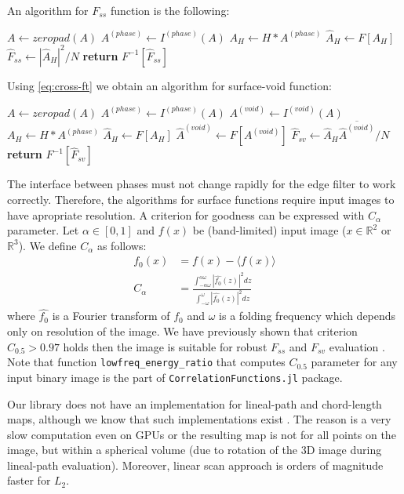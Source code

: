 \documentclass[1p]{elsarticle}
\newcommand{\code}[1]{\colorbox{light-gray}{\texttt{#1}}}
\begin{document}
An algorithm for $F_{ss}$ function is the following:
\begin{algorithmic}[1]
    \State $A \gets zeropad(A)$
  \EndIf
  \State $A^{(phase)} \gets I^{(phase)} (A)$
  \State $A_H \gets H * A^{(phase)}$
  \State $\hat{A}_H \gets F[A_H]$
  \State $\hat{F}_{ss} \gets |\hat{A}_H|^2 / N$
  \State \textbf{return} $F^{-1} [\hat{F}_{ss}]$
  \EndProcedure
\end{algorithmic}

Using \cref{eq:cross-ft} we obtain an algorithm for surface-void function:
\begin{algorithmic}[1]
    \State $A \gets zeropad(A)$
  \EndIf
  \State $A^{(phase)} \gets I^{(phase)} (A)$
  \State $A^{(void)} \gets I^{(void)} (A)$
  \State $A_H \gets H * A^{(phase)}$
  \State $\hat{A}_H \gets F[A_H]$
  \State $\hat{A}^{(void)} \gets F[A^{(void)}]$
  \State $\hat{F}_{sv} \gets \hat{A}_H \overline{\hat{A}^{(void)}} / N$
  \State \textbf{return} $F^{-1} [\hat{F}_{sv}]$
  \EndProcedure
\end{algorithmic}

The interface between phases must not change rapidly for the edge filter to
work correctly. Therefore, the algorithms for surface functions require input
images to have apropriate resolution. A criterion for goodness can be expressed with
$C_{\alpha}$ parameter. Let $\alpha \in [0, 1]$ and $f(x)$ be
(band-limited) input image ($x \in \mathbb{R}^2$ or $\mathbb{R}^3$). We define
$C_\alpha$ as follows:
\begin{align*}
  f_0(x) &= f(x) - \langle f(x) \rangle \\
  C_\alpha &= \frac{\int_{-\alpha\omega}^{\alpha\omega} |\hat{f_0}(z)|^2
    dz}{\int_{-\omega}^{\omega} |\hat{f_0}(z)|^2 dz}
\end{align*}
where $\hat{f_0}$ is a Fourier transform of $f_0$ and $\omega$ is a folding
frequency which depends only on resolution of the image. We have previously
shown that criterion $C_{0.5} > 0.97$ holds then the image is suitable for
robust $F_{ss}$ and $F_{sv}$ evaluation \cite{samarin2023robust}.  Note that
function \code{lowfreq\_energy\_ratio} that computes $C_{0.5}$ parameter for any
input binary image is the part of \code{CorrelationFunctions.jl} package.

Our library does not have an implementation for lineal-path and chord-length
maps, although we know that such implementations exist
\cite{turner2016efficient,Havelka}. The reason is a very slow computation even
on GPUs or the resulting map is not for all points on the image, but within a
spherical volume (due to rotation of the 3D image during lineal-path
evaluation). Moreover, linear scan approach is orders of magnitude faster for
$L_2$.
\end{document}
